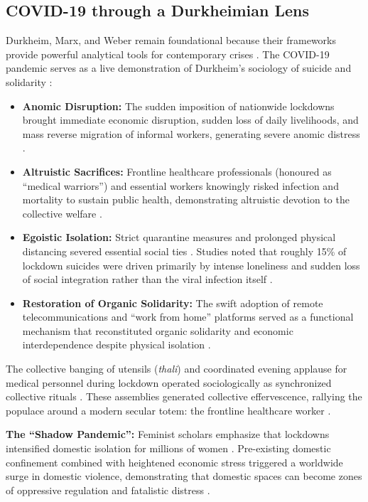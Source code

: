 \subsection{COVID-19 through a Durkheimian Lens}

Durkheim, Marx, and Weber remain foundational because their frameworks provide powerful analytical tools for contemporary crises . The COVID-19 pandemic serves as a live demonstration of Durkheim's sociology of suicide and solidarity :

\begin{itemize}
    \item \textbf{Anomic Disruption:} The sudden imposition of nationwide lockdowns brought immediate economic disruption, sudden loss of daily livelihoods, and mass reverse migration of informal workers, generating severe anomic distress .
    \item \textbf{Altruistic Sacrifices:} Frontline healthcare professionals (honoured as ``medical warriors'') and essential workers knowingly risked infection and mortality to sustain public health, demonstrating altruistic devotion to the collective welfare .
    \item \textbf{Egoistic Isolation:} Strict quarantine measures and prolonged physical distancing severed essential social ties . Studies noted that roughly 15\% of lockdown suicides were driven primarily by intense loneliness and sudden loss of social integration rather than the viral infection itself .
    \item \textbf{Restoration of Organic Solidarity:} The swift adoption of remote telecommunications and ``work from home'' platforms served as a functional mechanism that reconstituted organic solidarity and economic interdependence despite physical isolation .
\end{itemize}

\begin{DataFact}
The collective banging of utensils (\textit{thali}) and coordinated evening applause for medical personnel during lockdown operated sociologically as synchronized collective rituals . These assemblies generated collective effervescence, rallying the populace around a modern secular totem: the frontline healthcare worker .
\end{DataFact}

\begin{CriticalPoint}
\textbf{The ``Shadow Pandemic'':}
Feminist scholars emphasize that lockdowns intensified domestic isolation for millions of women . Pre-existing domestic confinement combined with heightened economic stress triggered a worldwide surge in domestic violence, demonstrating that domestic spaces can become zones of oppressive regulation and fatalistic distress .
\end{CriticalPoint}

